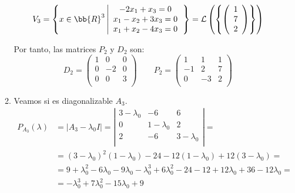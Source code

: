 \begin{ejercicio}
\begin{enumerate}
\begin{enumerate}
            \begin{equation*}
            V_3 = \left\{x\in\bb{R}^3 \left| \begin{array}{c}
                 -2x_1+x_3 = 0  \\
                 x_1-x_2+3x_3 =0 \\
                 x_1+x_2-4x_3 = 0
            \end{array}\right.\right\} = \mathcal{L}\left(\left\{ \left(\begin{array}{c}
                    1 \\
                    7 \\
                    2 \\
               \end{array}\right)
               \right\}\right)
            \end{equation*}
    
            Por tanto, las matrices $P_2$ y $D_2$ son:
            \begin{equation*}
                D_2 = \left( \begin{array}{ccc}
                    1 & 0 & 0 \\
                    0 & -2 & 0 \\
                    0 & 0 & 3 \\
                \end{array}\right) \qquad 
                P_2 = \left( \begin{array}{ccc}
                    1 & 1 & 1 \\
                    -1 & 2 & 7 \\
                    0 & -3 & 2 \\
                \end{array}\right)
            \end{equation*}

            \item Veamos si es diagonalizable $A_3$.
            \begin{equation*}\begin{split}
                P_{A_3}(\lambda) & = |A_3-\lambda_0 I| = \left| \begin{array}{ccc}
                3-\lambda_0 & -6 & 6 \\
                0 & 1-\lambda_0 & 2 \\
                2 & -6 & 3-\lambda_0 \\
                \end{array}\right| =\\
                & = (3-\lambda_0)^2(1-\lambda_0)-24-12(1-\lambda_0)+12(3-\lambda_0) = \\
                &= 9+\lambda_0^2-6\lambda_0 -9\lambda_0-\lambda_0^3+6\lambda_0^2 -24 -12 +12\lambda_0 +36 -12\lambda_0 = \\
                &= -\lambda_0^3 + 7\lambda_0^2-15\lambda_0 + 9
            \end{split}\end{equation*}


\end{enumerate}
\end{enumerate}
\end{ejercicio}
